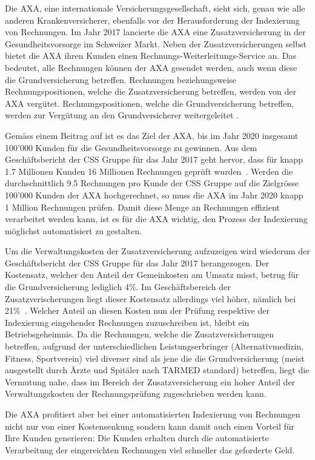 Die AXA, eine internationale Versicherungsgesellschaft, sieht sich, genau wie alle anderen Krankenversicherer, ebenfalls vor der Herausforderung der Indexierung von Rechnungen. Im Jahr 2017 lancierte die AXA eine Zusatzversicherung in der Gesundheitsvorsorge im Schweizer Markt. Neben der Zusatzversicherungen selbst bietet die AXA ihren Kunden einen Rechnungs-Weiterleitungs-Service an. Das bedeutet, alle Rechnungen können der AXA gesendet werden, auch wenn diese die Grundversicherung betreffen. Rechnungen beziehungsweise Rechnungspositionen, welche die Zusatzversicherung betreffen, werden von der AXA vergütet. Rechnungspositionen, welche die Grundversicherung betreffen, werden zur Vergütung an den Grundversicherer weitergeleitet \autocite{Finanzen.ch2017}.

Gemäss einem Beitrag auf \textcite{Finanzen.ch2017} ist es das Ziel der AXA, bis im Jahr 2020 insgesamt 100'000 Kunden für die Gesundheitsvorsorge zu gewinnen. Aus dem Geschäftsbericht der CSS Gruppe für das Jahr 2017 geht hervor, dass für knapp 1.7 Millionen Kunden 16 Millionen Rechnungen geprüft wurden~\autocite{CSSGruppe2018}. Werden die durchschnittlich 9.5 Rechnungen pro Kunde der CSS Gruppe auf die Zielgrösse 100'000 Kunden der AXA hochgerechnet, so muss die AXA im Jahr 2020 knapp 1 Million Rechnungen prüfen. Damit diese Menge an Rechnungen effizient verarbeitet werden kann, ist es für die AXA wichtig, den Prozess der Indexierung möglichst automatisiert zu gestalten.

Um die Verwaltungskosten der Zusatzversicherung aufzuzeigen wird wiederum der Ge\-schäfts\-be\-richt der CSS Gruppe für das Jahr 2017 herangezogen. Der Kostensatz, welcher den Anteil der Gemeinkosten am Umsatz misst, betrug für die Grundversicherung lediglich 4\%. Im Geschäftsbereich der Zusatzverischerungen liegt dieser Kostensatz allerdings viel höher, nämlich bei 21\%~\autocite{CSSGruppe2018}. Welcher Anteil an diesen Kosten nun der Prüfung respektive der Indexierung eingehender Rechnungen zuzuschreiben ist, bleibt ein Betriebsgeheimnis. Da die Rechnungen, welche die Zusatzversicherungen betreffen, aufgrund der unterschiedlichen Leistungserbringer (Alternativmedizin, Fitness, Sportverein) viel diverser sind als jene die die Grundversicherung (meist ausgestellt durch Ärzte und Spitäler nach TARMED standard) betreffen, liegt die Vermutung nahe, dass im Bereich der Zusatzversicherung ein hoher Anteil der Verwaltungskosten der Rechnungsprüfung zugeschrieben werden kann.

Die AXA profitiert aber bei einer automatisierten Indexierung von Rechnungen nicht nur von einer Kostensenkung sondern kann damit auch einen Vorteil für Ihre Kunden generieren: Die Kunden erhalten durch die automatisierte Verarbeitung der eingereichten Rechnungen viel schneller das geforderte Geld.

